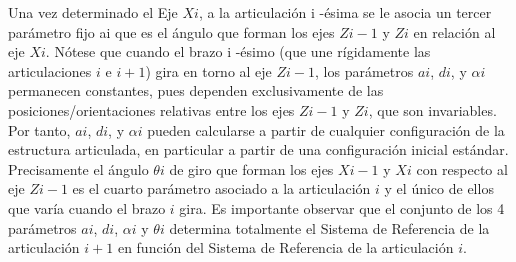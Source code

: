 \documentclass[11pt,a4paper,oldfontcommands,oneside]{memoir}
\begin{document}
Una vez determinado el Eje $Xi$, a la articulación i -ésima se le asocia un tercer parámetro fijo ai que es el ángulo que forman los ejes $Zi-1$ y $Zi$ en relación al eje $Xi$.
Nótese que cuando el brazo i -ésimo (que une rígidamente las articulaciones $i$ e $i+1$) gira en torno al eje $Zi-1$, los parámetros $ai$, $di$, y $\alpha i$ permanecen constantes, pues dependen exclusivamente de las posiciones/orientaciones relativas entre los ejes $Zi-1$ y $Zi$, que son invariables. Por tanto, $ai$, $di$, y $\alpha i$ pueden calcularse a partir de cualquier configuración de la estructura articulada, en particular a partir de una configuración inicial estándar. Precisamente el ángulo $\theta i$ de giro que forman los ejes $Xi-1$ y $Xi$ con respecto al eje $Zi-1$ es el cuarto parámetro asociado a la articulación $i$ y el único de ellos que varía cuando el brazo $i$ gira.
Es importante observar que el conjunto de los 4 parámetros $ai$, $di$, $\alpha i$ y $\theta i$ determina totalmente el Sistema de Referencia de la articulación $i+1$ en función del Sistema de Referencia de la articulación $i$.

\vspace{2cm}
\hfill
\end{document}
